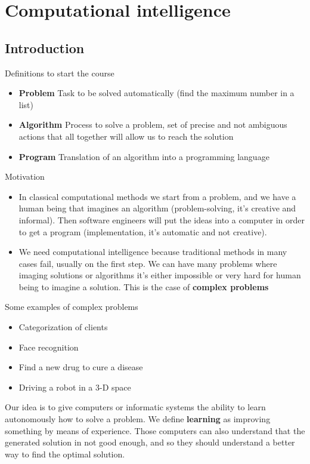 \section{Computational intelligence}

\subsection{Introduction}

Definitions to start the course 
\begin{itemize}
    \item \textbf{Problem} \ra Task to be solved automatically (find the maximum number in a list)
    \item \textbf{Algorithm} \ra Process to solve a problem, set of precise and not ambiguous actions that all together will allow us to reach the solution
    \item \textbf{Program} \ra Translation of an algorithm into a programming language
\end{itemize}

Motivation

\begin{itemize}
    \item In classical computational methods we start from a problem, and we have a human being that imagines an algorithm (problem-solving, it's creative and informal). Then software engineers will put the ideas into a computer in order to get a program (implementation, it's automatic and not creative). 
    \item We need computational intelligence because traditional methods in many cases fail, usually on the first step. We can have many problems where imaging solutions or algorithms it's either impossible or very hard for human being to imagine a solution. This is the case of \textbf{complex problems}
\end{itemize}


Some examples of complex problems
\begin{itemize}
    \item Categorization of clients
    \item Face recognition
    \item Find a new drug to cure a disease
    \item Driving a robot in a 3-D space 
\end{itemize}

Our idea is to give computers or informatic systems the ability to learn autonomously how to solve a problem. We define \textbf{learning} as improving something by means of experience. Those computers can also understand that the generated solution in not good enough, and so they should understand a better way to find the optimal solution. 

